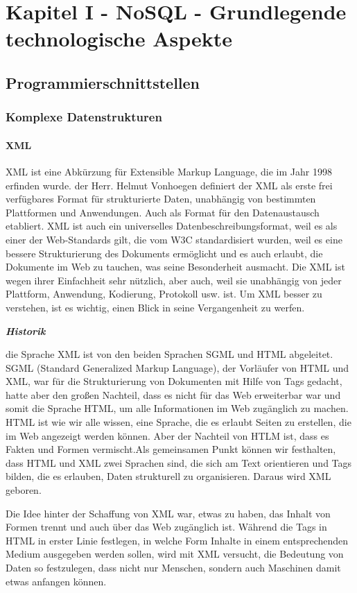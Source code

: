\chapter{Kapitel I - NoSQL - Grundlegende technologische Aspekte}
\section{Programmierschnittstellen}

\subsection{Komplexe Datenstrukturen}
\subsubsection{XML}
XML ist eine Abkürzung für Extensible Markup Language, die im Jahr 1998 erfinden wurde. der Herr. Helmut Vonhoegen definiert der XML als erste frei verfügbares Format für strukturierte Daten, unabhängig von bestimmten Plattformen und Anwendungen. Auch als Format für den Datenaustausch etabliert. XML ist auch ein universelles Datenbeschreibungsformat, weil es als einer der Web-Standards gilt, die vom W3C standardisiert wurden, weil es eine bessere Strukturierung des Dokuments ermöglicht und es auch erlaubt, die Dokumente im Web zu tauchen, was seine Besonderheit ausmacht. Die XML ist wegen ihrer Einfachheit sehr nützlich, aber auch, weil sie unabhängig von jeder Plattform, Anwendung, Kodierung, Protokoll usw. ist. Um XML besser zu verstehen, ist es wichtig, einen Blick in seine Vergangenheit zu werfen.

\textit{\textbf{Historik}}

die Sprache XML ist von den beiden Sprachen SGML und HTML abgeleitet. SGML (Standard Generalized Markup Language), der Vorläufer von HTML und XML, war für die Strukturierung von Dokumenten mit Hilfe von Tags gedacht, hatte aber den großen Nachteil, dass es nicht für das Web erweiterbar war und somit die Sprache HTML, um alle Informationen im Web zugänglich zu machen.  HTML ist wie wir alle wissen, eine Sprache, die es erlaubt Seiten zu erstellen, die im Web angezeigt werden können. Aber der Nachteil von HTLM ist, dass es Fakten und Formen vermischt.Als gemeinsamen Punkt können wir festhalten, dass HTML und XML zwei Sprachen sind, die sich am Text orientieren und Tags bilden, die es erlauben, Daten strukturell zu organisieren. Daraus wird XML geboren. 

Die Idee hinter der Schaffung von XML war, etwas zu haben, das Inhalt von Formen trennt und auch über das Web zugänglich ist. Während die Tags in HTML in erster Linie festlegen, in welche Form Inhalte in einem entsprechenden Medium ausgegeben werden sollen, wird mit XML versucht, die Bedeutung von Daten so festzulegen, dass nicht nur Menschen, sondern auch Maschinen damit etwas anfangen können.\cite{helmut32}


